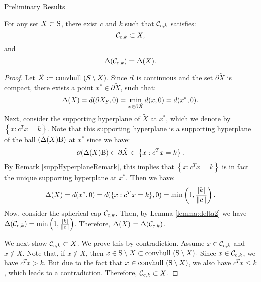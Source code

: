 \begin{subsection}{Preliminary Results}
\begin{lemma}\label{lemma:constructSC}For any set $X \subset \text{S}$, there exist $c$ and $k$ such that $\mathcal{C}_{c,k}$ satisfies:
\begin{equation*}\mathcal{C}_{c,k} \subset X,
\end{equation*}
 and
\begin{equation}\Delta(\mathcal{C}_{c,k}) = \Delta(X).
\end{equation}
\end{lemma}

\begin{proof} Let $\tilde{X} := \mbox{convhull }(S \setminus X)$.
Since $d$ is continuous and the set $\partial \tilde{X}$ is compact, there exists a point $x^* \in \partial \tilde{X}$, such that:
\begin{eqnarray}\nonumber \Delta(X) = d(\partial X_S, 0) = 
\label{deltaSupporting} \min_{x \in \partial \tilde{X}}d(x, 0) = d(x^*, 0).\end{eqnarray} 
Next, consider the supporting hyperplane of $\tilde{X}$ at $x^*$, which we denote by $\left\{x : c^Tx = k\right\}$. Note that this supporting hyperplane is a supporting hyperplane of the ball $(\Delta(X)\text{B})$ at $x^*$ since we have:
\begin{equation*} \partial (\Delta(X)\text{B}) \subset \partial \tilde{X} \subset \left\{x : c^Tx = k\right\}.\end{equation*}  By Remark \ref{suppHyperplaneRemark}, this implies that $\left\{x : c^Tx = k\right\}$ is in fact the unique supporting hyperplane at $x^*$.
Then we have:
\begin{equation*}\Delta(X) =  d(x^*, 0) = d(\{x : c^Tx = k\}, 0) = \min\left(1, \frac{|k|}{\|c\|}\right).
\end{equation*}
Now, consider the spherical cap $\mathcal{C}_{c,k}$. Then, by Lemma \ref{lemma:delta2} we have
$\Delta(\mathcal{C}_{c,k}) =  \min\left(1, \frac{|k|}{\|c\|}\right)$. Therefore, $\Delta(X) = \Delta(\mathcal{C}_{c,k})$.


We next show $\mathcal{C}_{c, k} \subset X$. We prove this by contradiction. Assume $x \in \mathcal{C}_{c,k}$ and $x \notin X$. Note that, if $x \notin X$, then $x \in \text{S} \setminus X \subset \mbox{convhull }(\text{S} \setminus X).$ Since $x \in \mathcal{C}_{c,k}$, we have $c^Tx>k$. But due to the fact that $x \in \mbox{convhull }(\text{S} \setminus X)$, we also have $c^Tx \leq k$, which leads to a contradiction. Therefore, $\mathcal{C}_{c, k} \subset X$. 
\end{proof}


\end{subsection}
